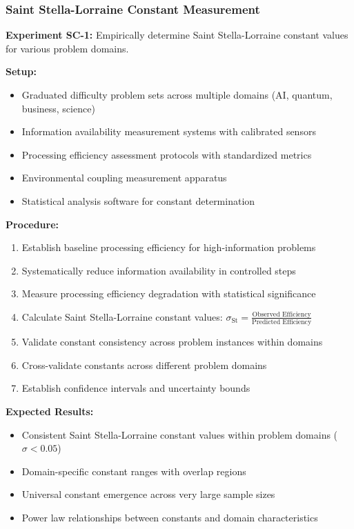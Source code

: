 \documentclass[11pt]{article}
\theoremstyle{definition}
\theoremstyle{remark}
\newcommand{\StellasConstant}{\sigma_{\text{St}}}
\begin{document}
\subsubsection{Saint Stella-Lorraine Constant Measurement}

\textbf{Experiment SC-1:} Empirically determine Saint Stella-Lorraine constant values for various problem domains.

\textbf{Setup:}
\begin{itemize}
\item Graduated difficulty problem sets across multiple domains (AI, quantum, business, science)
\item Information availability measurement systems with calibrated sensors
\item Processing efficiency assessment protocols with standardized metrics
\item Environmental coupling measurement apparatus
\item Statistical analysis software for constant determination
\end{itemize}

\textbf{Procedure:}
\begin{enumerate}
\item Establish baseline processing efficiency for high-information problems
\item Systematically reduce information availability in controlled steps
\item Measure processing efficiency degradation with statistical significance
\item Calculate Saint Stella-Lorraine constant values: $\StellasConstant = \frac{\text{Observed Efficiency}}{\text{Predicted Efficiency}}$
\item Validate constant consistency across problem instances within domains
\item Cross-validate constants across different problem domains
\item Establish confidence intervals and uncertainty bounds
\end{enumerate}

\textbf{Expected Results:} 
\begin{itemize}
\item Consistent Saint Stella-Lorraine constant values within problem domains ($\sigma < 0.05$)
\item Domain-specific constant ranges with overlap regions
\item Universal constant emergence across very large sample sizes
\item Power law relationships between constants and domain characteristics
\end{itemize}
\end{document}
